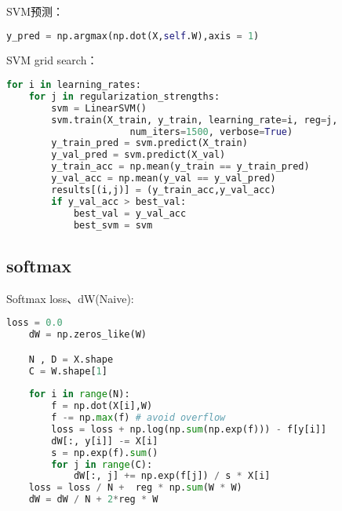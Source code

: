 \documentclass[a4paper]{article}
\begin{document}
SVM预测：
\begin{lstlisting}[language=Python, caption=SVM预测]
    y_pred = np.argmax(np.dot(X,self.W),axis = 1)
\end{lstlisting}

SVM grid search：
\begin{lstlisting}[language=Python, caption=SVM grid search]
    for i in learning_rates:
    for j in regularization_strengths:
        svm = LinearSVM()
        svm.train(X_train, y_train, learning_rate=i, reg=j,
                      num_iters=1500, verbose=True)
        y_train_pred = svm.predict(X_train) 
        y_val_pred = svm.predict(X_val)
        y_train_acc = np.mean(y_train == y_train_pred)
        y_val_acc = np.mean(y_val == y_val_pred)
        results[(i,j)] = (y_train_acc,y_val_acc)
        if y_val_acc > best_val:
            best_val = y_val_acc
            best_svm = svm
\end{lstlisting}

\subsection{softmax}
Softmax loss、dW(Naive):
\begin{lstlisting}[language=Python, caption=Softmax(Naive)]
    loss = 0.0
    dW = np.zeros_like(W)

    N , D = X.shape
    C = W.shape[1]
    
    for i in range(N):
        f = np.dot(X[i],W)
        f -= np.max(f) # avoid overflow
        loss = loss + np.log(np.sum(np.exp(f))) - f[y[i]]
        dW[:, y[i]] -= X[i]
        s = np.exp(f).sum()
        for j in range(C):
            dW[:, j] += np.exp(f[j]) / s * X[i]
    loss = loss / N +  reg * np.sum(W * W)
    dW = dW / N + 2*reg * W
\end{lstlisting}
\end{document}
